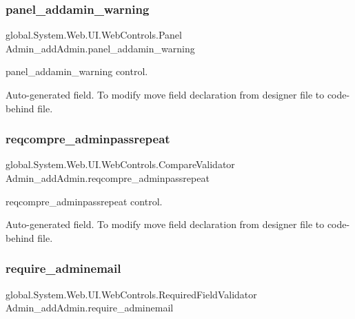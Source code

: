 \subsubsection{\texorpdfstring{panel\_addamin\_warning}{panel\_addamin\_warning}}
{\footnotesize\ttfamily global.\+System.\+Web.\+U\+I.\+Web\+Controls.\+Panel Admin\+\_\+add\+Admin.\+panel\+\_\+addamin\+\_\+warning\hspace{0.3cm}{\ttfamily [protected]}}



panel\+\_\+addamin\+\_\+warning control. 

Auto-\/generated field. To modify move field declaration from designer file to code-\/behind file. \mbox{\label{class_admin__add_admin_afa70dac6852d8bd87362de69600ddd65}} 
\subsubsection{\texorpdfstring{reqcompre\_adminpassrepeat}{reqcompre\_adminpassrepeat}}
{\footnotesize\ttfamily global.\+System.\+Web.\+U\+I.\+Web\+Controls.\+Compare\+Validator Admin\+\_\+add\+Admin.\+reqcompre\+\_\+adminpassrepeat\hspace{0.3cm}{\ttfamily [protected]}}



reqcompre\+\_\+adminpassrepeat control. 

Auto-\/generated field. To modify move field declaration from designer file to code-\/behind file. \mbox{\label{class_admin__add_admin_abdba1d2252295175f77fffe9d85e36c7}} 
\subsubsection{\texorpdfstring{require\_adminemail}{require\_adminemail}}
{\footnotesize\ttfamily global.\+System.\+Web.\+U\+I.\+Web\+Controls.\+Required\+Field\+Validator Admin\+\_\+add\+Admin.\+require\+\_\+adminemail\hspace{0.3cm}{\ttfamily [protected]}}



